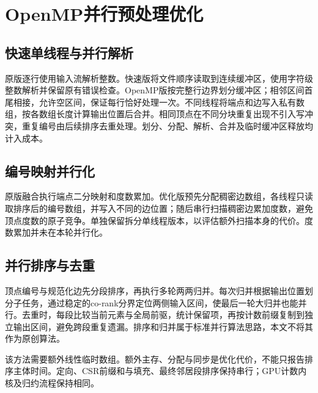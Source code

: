\section{OpenMP并行预处理优化}
\subsection{快速单线程与并行解析}
原版逐行使用输入流解析整数。快速版将文件顺序读取到连续缓冲区，使用字符级整数解析并保留原有错误检查。OpenMP版按完整行边界划分缓冲区；相邻区间首尾相接，允许空区间，保证每行恰好处理一次。不同线程将端点和边写入私有数组，按各数组长度计算输出位置后合并。相同顶点在不同分块重复出现不引入写冲突，重复编号由后续排序去重处理。划分、分配、解析、合并及临时缓冲区释放均计入成本。

\subsection{编号映射并行化}
原版融合执行端点二分映射和度数累加。优化版预先分配稠密边数组，各线程只读取排序后的编号数组，并写入不同的边位置；随后串行扫描稠密边累加度数，避免顶点度数的原子竞争。单独保留拆分单线程版本，以评估额外扫描本身的代价。度数累加并未在本轮并行化。

\subsection{并行排序与去重}
顶点编号与规范化边先分段排序，再执行多轮两两归并。每次归并根据输出位置划分子任务，通过稳定的co-rank分界定位两侧输入区间，使最后一轮大归并也能并行。去重时，每段比较当前元素与全局前驱，统计保留项，再按计数前缀复制到独立输出区间，避免跨段重复遗漏。排序和归并属于标准并行算法思路，本文不将其作为原创算法。

该方法需要额外线性临时数组。额外主存、分配与同步是优化代价，不能只报告排序主体时间。定向、CSR前缀和与填充、最终邻居段排序保持串行；GPU计数内核及归约流程保持相同。
